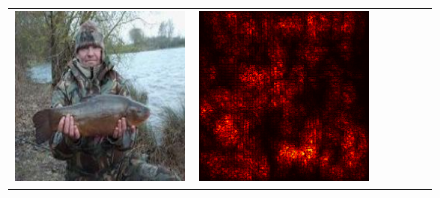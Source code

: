 \documentclass[preprint,12pt]{elsarticle}
\begin{document}
\begin{figure}[p]
\begin{tabular}{cccccc}
  \includegraphics[scale=\scale]{../visualizations/examples/imagenette/cnn/images/4.png} &
  \includegraphics[scale=\scale]{../visualizations/examples/imagenette/cnn/saliency_map/4.png} & 

\end{tabular}
\end{figure}
\end{document}
